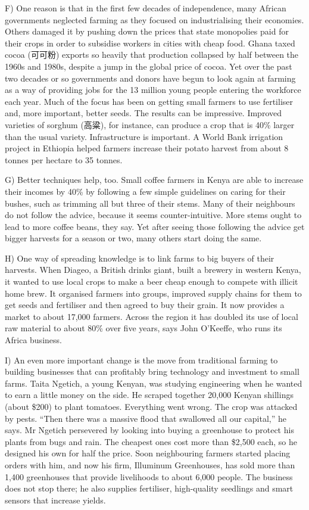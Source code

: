 \documentclass[UTF8,11pt]{ctexart}
\begin{document}
F) One reason is that in the first few decades of independence, many African governments neglected farming as they focused on industrialising their economies. Others damaged it by pushing down the prices that state monopolies paid for their crops in order to subsidise workers in cities with cheap food. Ghana taxed cocoa (可可粉) exports so heavily that production collapsed by half between the 1960s and 1980s, despite a jump in the global price of cocoa. Yet over the past two decades or so governments and donors have begun to look again at farming as a way of providing jobs for the 13 million young people entering the workforce each year. Much of the focus has been on getting small farmers to use fertiliser and, more important, better seeds. The results can be impressive. Improved varieties of sorghum (高粱), for instance, can produce a crop that is 40\% larger than the usual variety. Infrastructure is important. A World Bank irrigation project in Ethiopia helped farmers increase their potato harvest from about 8 tonnes per hectare to 35 tonnes.


G) Better techniques help, too. Small coffee farmers in Kenya are able to increase their incomes by 40\% by following a few simple guidelines on caring for their bushes, such as trimming all but three of their stems. Many of their neighbours do not follow the advice, because it seems counter-intuitive. More stems ought to lead to more coffee beans, they say. Yet after seeing those following the advice get bigger harvests for a season or two, many others start doing the same.


H) One way of spreading knowledge is to link farms to big buyers of their harvests. When Diageo, a British drinks giant, built a brewery in western Kenya, it wanted to use local crops to make a beer cheap enough to compete with illicit home brew. It organised farmers into groups, improved supply chains for them to get seeds and fertiliser and then agreed to buy their grain. It now provides a market to about 17,000 farmers. Across the region it has doubled its use of local raw material to about 80\% over five years, says John O’Keeffe, who runs its Africa business.


I) An even more important change is the move from traditional farming to building businesses that can profitably bring technology and investment to small farms. Taita Ngetich, a young Kenyan, was studying engineering when he wanted to earn a little money on the side. He scraped together 20,000 Kenyan shillings (about \$200) to plant tomatoes. Everything went wrong. The crop was attacked by pests. “Then there was a massive flood that swallowed all our capital,” he says. Mr Ngetich persevered by looking into buying a greenhouse to protect his plants from bugs and rain. The cheapest ones cost more than \$2,500 each, so he designed his own for half the price. Soon neighbouring farmers started placing orders with him, and now his firm, Illuminum Greenhouses, has sold more than 1,400 greenhouses that provide livelihoods to about 6,000 people. The business does not stop there; he also supplies fertiliser, high-quality seedlings and smart sensors that increase yields.
\end{document}
